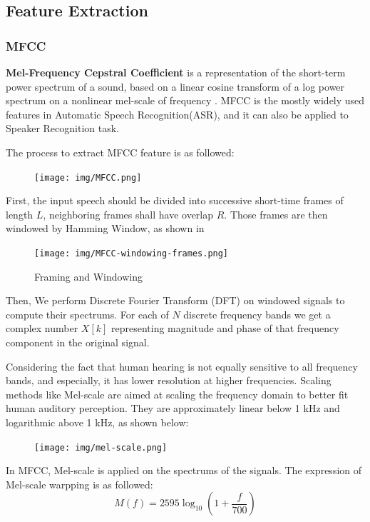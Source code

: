 
\subsection{Feature Extraction}

\subsubsection{MFCC}
\label{sec:mfcc}
\textbf{Mel-Frequency Cepstral Coefficient} is a representation of the short-term power spectrum of a sound,
based on a linear cosine transform of a log power spectrum on a nonlinear mel-scale of frequency \cite{mfcc} .
MFCC is the mostly widely used features in Automatic Speech Recognition(ASR), and it can also be applied to Speaker Recognition task.


The process to extract MFCC feature is as followed:
\begin{figure}[H]
  \centering
  \texttt{[image: img/MFCC.png]}
\end{figure}

First, the input speech should be divided into successive short-time frames of length $L$,
neighboring frames shall have overlap $R$.
Those frames are then windowed by Hamming Window, as shown in 
\begin{figure}[H]
  \centering
  \texttt{[image: img/MFCC-windowing-frames.png]}
  \caption{Framing and Windowing \label{fig:framming}}
\end{figure}

Then, We perform Discrete Fourier Transform (DFT) on windowed signals to compute their spectrums.
For each of $N$ discrete frequency bands we get a complex number $X[k]$ representing
magnitude and phase of that frequency component in the original signal.

Considering the fact that human hearing is not equally sensitive to all frequency bands, and especially,
it has lower resolution at higher frequencies.
Scaling methods like Mel-scale are aimed at scaling the frequency domain to better fit human auditory perception.
They are approximately linear below 1 kHz and logarithmic above 1 kHz, as shown below:
\begin{figure}[H]
  \centering
  \texttt{[image: img/mel-scale.png]}
\end{figure}

In MFCC, Mel-scale is applied on the spectrums of the signals.
The expression of Mel-scale warpping is as followed:
\[ M(f) = 2595 \log_{10}(1 + \dfrac{f}{700}) \]

